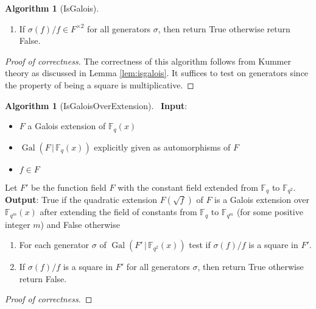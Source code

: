 \documentclass{dcthesis}
\newcommand{\FF}{\mathbb{F}}
\DeclareMathOperator{\Gal}{Gal}
\numberwithin{equation}{section}
\theoremstyle{definition}
\newtheorem{alg}[equation]{Algorithm}
\theoremstyle{remark}
\begin{document}
{{{\begin{alg}[IsGalois]
\begin{enumerate}
          test if $\sigma(f)/f$ is a square
          in $F^\times$.
        \item
          If $\sigma(f)/f\in F^{\times 2}$
          for all generators $\sigma$,
          then return \textsf{True}
          otherwise return \textsf{False}.
      \end{enumerate}
    \end{alg}
    \begin{proof}[Proof of correctness]
      The correctness of this algorithm
      follows from Kummer theory
      as discussed in
      Lemma \ref{lem:isgalois}.
      It suffices to test on generators
      since the property of being a square
      is multiplicative.
    \end{proof}
    \begin{alg}[IsGaloisOverExtension]
      \label{alg:isgaloisoverextension}
      \,
      \newline
      \textbf{Input}:
      \begin{itemize}
        \item
          $F$ a Galois extension of
          $\FF_q(x)$
        \item
          $\Gal(F\,|\,\FF_q(x))$
          explicitly given
          as automorphisms of $F$
        \item
          $f\in F$
      \end{itemize}
      Let $F'$ be the function field $F$
      with the constant field
      extended
      from $\FF_q$ to $\FF_{q^2}$.
      \textbf{Output}:
      \textsf{True} if the quadratic extension
      $F(\sqrt{f})$ of $F$
      is a Galois extension over $\FF_{q^m}(x)$
      after extending the field of constants
      from $\FF_q$ to $\FF_{q^m}$
      (for some positive integer $m$)
      and \textsf{False} otherwise
      \begin{enumerate}
        \item
          For each generator
          $\sigma$ of $\Gal(F'\,|\,\FF_{q^2}(x))$
          test if $\sigma(f)/f$ is a square
          in $F'$.
        \item
          If $\sigma(f)/f$ is a square in $F'$
          for all generators $\sigma$,
          then return \textsf{True}
          otherwise return \textsf{False}.
      \end{enumerate}
    \end{alg}
    \begin{proof}[Proof of correctness]

\end{proof}}}}
\end{document}
